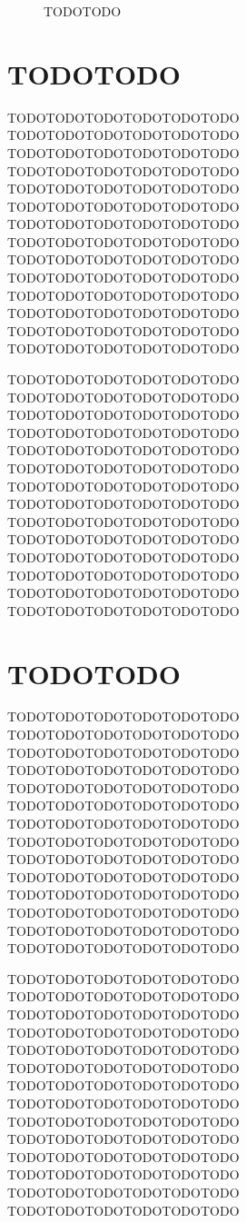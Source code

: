 \documentclass{jarticle}
\begin{document}
\begin{figure}[h]
    \centering
    \vspace{6cm}
    \caption{TODOTODO}
    \label{fig:todo-1}
\end{figure}

\section{TODOTODO}

TODOTODOTODOTODOTODOTODO TODOTODOTODOTODOTODOTODO
TODOTODOTODOTODOTODOTODO TODOTODOTODOTODOTODOTODO
TODOTODOTODOTODOTODOTODO TODOTODOTODOTODOTODOTODO
TODOTODOTODOTODOTODOTODO TODOTODOTODOTODOTODOTODO
TODOTODOTODOTODOTODOTODO TODOTODOTODOTODOTODOTODO
TODOTODOTODOTODOTODOTODO TODOTODOTODOTODOTODOTODO
TODOTODOTODOTODOTODOTODO TODOTODOTODOTODOTODOTODO


\vspace{8cm}

TODOTODOTODOTODOTODOTODO TODOTODOTODOTODOTODOTODO
TODOTODOTODOTODOTODOTODO TODOTODOTODOTODOTODOTODO
TODOTODOTODOTODOTODOTODO TODOTODOTODOTODOTODOTODO
TODOTODOTODOTODOTODOTODO TODOTODOTODOTODOTODOTODO
TODOTODOTODOTODOTODOTODO TODOTODOTODOTODOTODOTODO
TODOTODOTODOTODOTODOTODO TODOTODOTODOTODOTODOTODO
TODOTODOTODOTODOTODOTODO TODOTODOTODOTODOTODOTODO

\vspace{12cm}

\section{TODOTODO}

TODOTODOTODOTODOTODOTODO TODOTODOTODOTODOTODOTODO
TODOTODOTODOTODOTODOTODO TODOTODOTODOTODOTODOTODO
TODOTODOTODOTODOTODOTODO TODOTODOTODOTODOTODOTODO
TODOTODOTODOTODOTODOTODO TODOTODOTODOTODOTODOTODO
TODOTODOTODOTODOTODOTODO TODOTODOTODOTODOTODOTODO
TODOTODOTODOTODOTODOTODO TODOTODOTODOTODOTODOTODO
TODOTODOTODOTODOTODOTODO TODOTODOTODOTODOTODOTODO

\vspace{2cm}

TODOTODOTODOTODOTODOTODO TODOTODOTODOTODOTODOTODO
TODOTODOTODOTODOTODOTODO TODOTODOTODOTODOTODOTODO
TODOTODOTODOTODOTODOTODO TODOTODOTODOTODOTODOTODO
TODOTODOTODOTODOTODOTODO TODOTODOTODOTODOTODOTODO
TODOTODOTODOTODOTODOTODO TODOTODOTODOTODOTODOTODO
TODOTODOTODOTODOTODOTODO TODOTODOTODOTODOTODOTODO
TODOTODOTODOTODOTODOTODO TODOTODOTODOTODOTODOTODO

\vspace{6cm}
\end{document}
